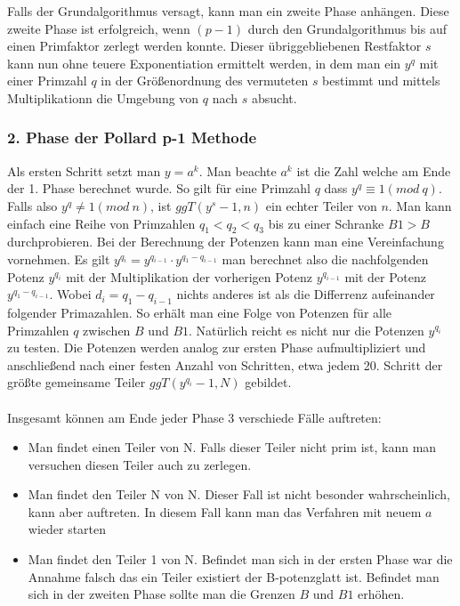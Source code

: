 \documentclass[10pt, bigheadings]{scrartcl}
\begin{document}
Falls der Grundalgorithmus  versagt, kann man ein zweite Phase anhängen. Diese zweite Phase
ist erfolgreich, wenn $(p-1)$ durch den Grundalgorithmus bis auf einen Primfaktor zerlegt werden
konnte. Dieser übriggebliebenen Restfaktor $s$ kann nun ohne teuere Exponentiation ermittelt werden,
in dem man ein $y^q$ mit einer Primzahl $q$ in der Größenordnung des vermuteten $s$ bestimmt und
mittels Multiplikationn die Umgebung von $q$ nach $s$ absucht.

\subsubsection*{2. Phase der Pollard p-1 Methode}

Als ersten Schritt setzt man $y = a^k$. Man beachte $a^k$ ist die Zahl welche am Ende der 1.
Phase berechnet wurde. So gilt für eine Primzahl $q$ dass $y^q \equiv 1 (mod \ q)$. Falls also
$y^q \neq 1 (mod\ n)$, ist $ggT(y^s -1, n)$ ein echter Teiler von $n$. Man
kann einfach eine Reihe von Primzahlen $q_1 < q_2 < q_3 $ bis zu einer Schranke $B1 > B$
durchprobieren. Bei der Berechnung der Potenzen kann man eine Vereinfachung vornehmen.
Es gilt $y^{q_i} = y^{q_{i-1}}\cdot y^{q_1 - q_{i-1}}$ man berechnet also die nachfolgenden Potenz  $y^{q_i}$ mit
der Multiplikation der vorherigen Potenz $y^{q_{i-1}}$ mit der Potenz $y^{q_1 - q_{i-1}}$. Wobei
$d_i = q_1 - q_{i-1}$ nichts anderes ist als die Differrenz aufeinander folgender Primazahlen. So erhält
man eine Folge von Potenzen für alle Primzahlen $q$ zwischen $B$ und $B1$. Natürlich
reicht es nicht nur die
Potenzen $y^{q_i}$ zu testen. Die Potenzen werden analog zur ersten Phase aufmultipliziert und
anschließend nach einer festen Anzahl von Schritten, etwa jedem 20. Schritt der größte gemeinsame Teiler
$ggT(y^{q_i}-1, N)$ gebildet.\\\\
Insgesamt können am Ende jeder Phase 3 verschiede Fälle auftreten:
\begin{itemize}
\item Man findet einen Teiler von N. Falls dieser Teiler nicht prim ist, kann man versuchen
	diesen Teiler auch zu zerlegen.
\item Man findet den Teiler N von N. Dieser Fall ist nicht besonder wahrscheinlich, kann aber auftreten.
	In diesem Fall kann man das Verfahren mit neuem $a$ wieder starten

\item Man findet den Teiler 1 von N. Befindet man sich in der ersten Phase war die Annahme falsch das ein Teiler
	existiert der B-potenzglatt ist. Befindet man sich in der zweiten Phase sollte
 	man die Grenzen $B$ und $B1$ erhöhen.
\end{itemize}
\end{document}
